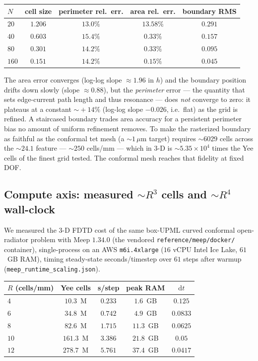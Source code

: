 \documentclass{anvil-paper}
\begin{document}
\begin{center}
\begin{tabular}{lcccc}
\toprule
$N$ & cell size & perimeter rel.\ err. & area rel.\ err. & boundary RMS \\
\midrule
$20$  & $1.206$ & $13.0\%$ & $13.58\%$ & $0.291$ \\
$40$  & $0.603$ & $15.4\%$ & $0.33\%$  & $0.157$ \\
$80$  & $0.301$ & $14.2\%$ & $0.33\%$  & $0.095$ \\
$160$ & $0.151$ & $14.2\%$ & $0.15\%$  & $0.045$ \\
\bottomrule
\end{tabular}
\end{center}

The area error converges (log-log slope $\approx\!1.96$ in $h$) and the boundary
position drifts down slowly (slope $\approx\!0.88$), but the \emph{perimeter}
error --- the quantity that sets edge-current path length and thus resonance ---
does \emph{not} converge to zero: it plateaus at a constant $\sim\!+14\%$
(log-log slope $-0.026$, i.e.\ flat) as the grid is refined. A staircased
boundary trades area accuracy for a persistent perimeter bias no amount of
uniform refinement removes. To make the rasterized boundary as faithful as the
conformal tet mesh (a $\sim\!1\,\mu$m target) requires $\sim\!6029$ cells across
the $\sim\!24.1$ feature --- $\sim\!250$ cells/mm --- which in 3-D is
$\sim\!5.35\times10^{4}$ times the Yee cells of the finest grid tested. The
conformal mesh reaches that fidelity at fixed DOF.

\subsection{Compute axis: measured $\sim\!R^3$ cells and $\sim\!R^4$ wall-clock}
\label{sec:runtime}

We measured the 3-D FDTD cost of the same box-UPML curved conformal open-radiator
problem with Meep $1.34.0$ (the vendored \texttt{reference/meep/docker/}
container), single-process on an AWS \texttt{m6i.4xlarge} ($16$ vCPU Intel Ice
Lake, $61$~GB RAM), timing steady-state seconds/timestep over $61$ steps after
warmup (\texttt{meep\_runtime\_scaling.json}).

\begin{center}
\begin{tabular}{lcccc}
\toprule
$R$ (cells/mm) & Yee cells & s/step & peak RAM & $\mathrm{d}t$ \\
\midrule
$4$  & $10.3$~M  & $0.233$ & $1.6$~GB  & $0.125$ \\
$6$  & $34.8$~M  & $0.742$ & $4.9$~GB  & $0.0833$ \\
$8$  & $82.6$~M  & $1.715$ & $11.3$~GB & $0.0625$ \\
$10$ & $161.3$~M & $3.386$ & $21.8$~GB & $0.05$ \\
$12$ & $278.7$~M & $5.761$ & $37.4$~GB & $0.0417$ \\
\bottomrule
\end{tabular}
\end{center}
\end{document}
